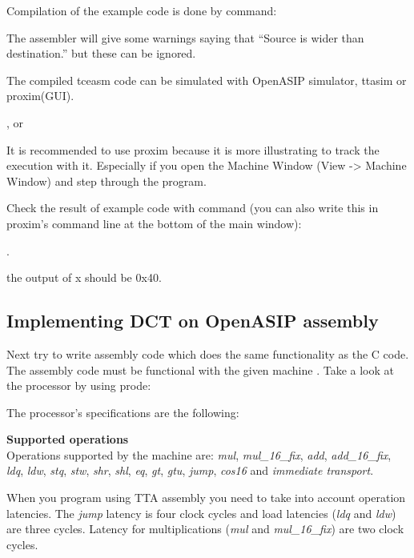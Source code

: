 \documentclass[a4paper,twoside]{tceusermanual}
\begin{document}
Compilation of the example code is done by command:


The assembler will give some warnings saying that ``Source is
wider than destination.'' but these can be ignored.

The compiled tceasm code can be simulated with OpenASIP
simulator, ttasim or proxim(GUI).

 , or


It is recommended to use proxim because it is more illustrating to track the
execution with it. Especially if you open the Machine Window (View -> Machine
Window) and step through the program.

Check the result of example code with command (you can also write this in
proxim's command line at the bottom of the main window):

. 

the output of x should be 0x40.

\subsection{Implementing DCT on OpenASIP assembly}

Next try to write assembly code which does the same functionality as the
C code. The assembly code must be functional with the given machine
\file{dct\_8x8\_16\_bit\_with\_sfus.adf}. Take a look at the processor by
using prode:


The processor's specifications are the following:

\textbf{Supported operations} \\
Operations supported by the machine are: \textit{mul}, \textit{mul\_16\_fix},
\textit{add}, \textit{add\_16\_fix}, \textit{ldq}, \textit{ldw}, \textit{stq},
\textit{stw}, \textit{shr}, \textit{shl}, \textit{eq}, \textit{gt},
\textit{gtu}, \textit{jump}, \textit{cos16} and \textit{immediate transport}.

When you program using TTA assembly you need to take into account 
operation latencies. The \textit{jump} latency is four clock cycles and load
latencies (\textit{ldq} and \textit{ldw}) are three cycles. Latency for
multiplications (\textit{mul} and \textit{mul\_16\_fix}) are two clock cycles.
\end{document}
